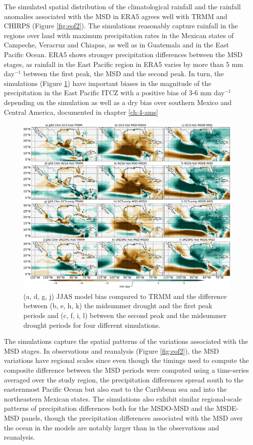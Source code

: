 The simulated spatial distribution of the climatological rainfall and the rainfall anomalies associated with the MSD in ERA5 agrees well with TRMM and CHIRPS (Figure \ref{fig:eof2}). The simulations reasonably capture rainfall in the regions over land with maximum precipitation rates in the Mexican states of Campeche, Veracruz and Chiapas, as well as in Guatemala and in the East Pacific Ocean. ERA5 shows stronger precipitation differences between the MSD stages, as rainfall in the East Pacific region in ERA5 varies by more than 5 mm day$^{-1}$ between the first peak, the MSD and the second peak. In turn, the simulations (Figure \ref{fig:model_pr}) have important biases in the magnitude of the  precipitation in the East Pacific ITCZ with a positive bias of 3-6 mm day$^{-1}$ depending on the simulation as well as a dry bias over southern Mexico and Central America, documented in chapter \ref{ch:4-ams}


\begin{figure}[t!]
\includegraphics[width=\linewidth]{figures/fig2obs_prmodels3}
\caption{ (a, d, g, j) JJAS model bias compared to TRMM and the difference between  (b, e, h, k)  the midsummer drought and the first peak periods and (c, f, i, l)  between the second peak and the midsummer drought periods for four different simulations.}
\label{fig:model_pr}
\end{figure} 
 
The simulations capture the spatial patterns of the variations associated with the MSD stages.
  In observations and reanalysis (Figure \ref{fig:eof2}), the MSD variations have regional scales since even though the timings used to compute the composite difference between the MSD periods were computed using a time-series averaged over the study region, the precipitation differences spread south to the easternmost Pacific Ocean but also east to the Caribbean sea and into the northeastern Mexican states. The simulations also exhibit similar regional-scale patterns of precipitation differences both for the MSDO-MSD and the MSDE-MSD panels, though the precipitation differences associated with the MSD over the ocean in the models are notably larger than in the observations and reanalysis.  
 

